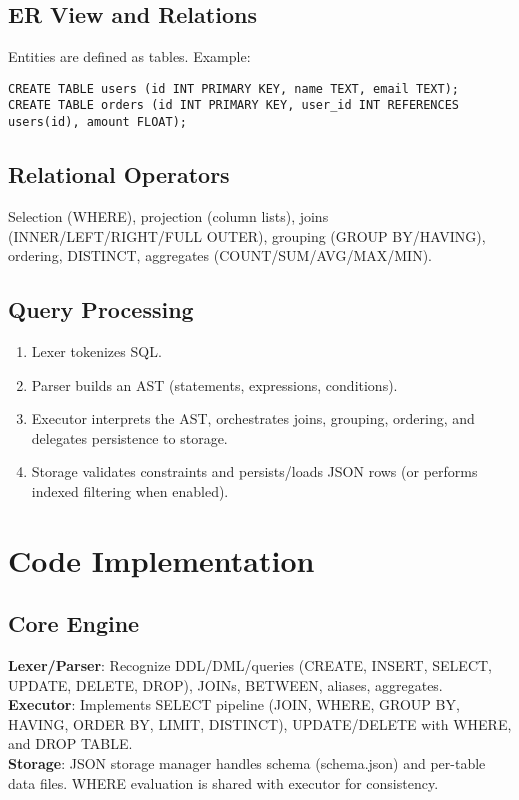 \documentclass[12pt,a4paper]{article}
\begin{document}
\subsection{ER View and Relations}
Entities are defined as tables. Example:
\begin{lstlisting}
CREATE TABLE users (id INT PRIMARY KEY, name TEXT, email TEXT);
CREATE TABLE orders (id INT PRIMARY KEY, user_id INT REFERENCES users(id), amount FLOAT);
\end{lstlisting}

\subsection{Relational Operators}
Selection (WHERE), projection (column lists), joins (INNER/LEFT/RIGHT/FULL OUTER), grouping (GROUP BY/HAVING), ordering, DISTINCT, aggregates (COUNT/SUM/AVG/MAX/MIN).

\subsection{Query Processing}
\begin{enumerate}[leftmargin=*,nosep]
  \item Lexer tokenizes SQL.
  \item Parser builds an AST (statements, expressions, conditions).
  \item Executor interprets the AST, orchestrates joins, grouping, ordering, and delegates persistence to storage.
  \item Storage validates constraints and persists/loads JSON rows (or performs indexed filtering when enabled).
\end{enumerate}

\section{Code Implementation}
\subsection{Core Engine}
\textbf{Lexer/Parser}: Recognize DDL/DML/queries (CREATE, INSERT, SELECT, UPDATE, DELETE, DROP), JOINs, BETWEEN, aliases, aggregates.\\
\textbf{Executor}: Implements SELECT pipeline (JOIN, WHERE, GROUP BY, HAVING, ORDER BY, LIMIT, DISTINCT), UPDATE/DELETE with WHERE, and DROP TABLE.\\
\textbf{Storage}: JSON storage manager handles schema (schema.json) and per-table data files. WHERE evaluation is shared with executor for consistency.
\end{document}
